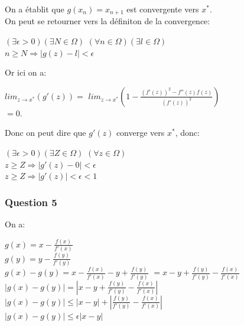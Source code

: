 \documentclass{article}
\begin{document}
	On a établit que $g(x_{n})=x_{n+1}$ est convergente vers $x^{*}$.\\
	
	On peut se retourner vers la définiton de la convergence:\\
	
	\begin{center}
	\begin{large}
		$(\exists \epsilon>0)(\exists N \in \Omega)$
		$(\forall n \in \Omega)(\exists l \in \Omega)$\\
		$n \geq N \Rightarrow |g(z)-l| < \epsilon$		\end{large}
	\end{center}
	
	Or ici on a:\\
	
	\begin{center}
		\begin{large}
			$lim_{z \to x^{*}}(g'(z))=$
			$lim_{z \to x^{*}}(1-\frac{(f'(z))^{2}-f''(z)f(z)}{(f'(z))^{2}})$\\
			$=0$.
		\end{large}
	\end{center}
	
	Donc on peut dire que $g'(z)$ converge vers $x^{*}$, donc: 
	
	\begin{center}
	\begin{large}
		$(\exists \epsilon>0)(\exists Z \in \Omega)$
		$(\forall z \in \Omega)$\\
		$z \geq Z \Rightarrow |g'(z)-0| < \epsilon
$\\
	$z \geq Z \Rightarrow |g'(z)| < \epsilon < 1
$
	\end{large}
	\end{center}
	
	\subsubsection{Question 5}
	
	On a:
	
	\begin{center}
		\begin{large}
			$g(x)=x-\frac{f(x)}{f'(x)}$\\
			$g(y)=y-\frac{f(y)}{f'(y)}$\\
			$g(x)-g(y)=x-\frac{f(x)}{f'(x)}-y+\frac{f(y)}{f'(y)}$
			$=x-y+\frac{f(y)}{f'(y)}-\frac{f(x)}{f'(x)}$\\
			$|g(x)-g(y)| = |x-y+\frac{f(y)}{f'(y)}-\frac{f(x)}{f'(x)}|$\\
			$|g(x)-g(y)| \le |x-y|+|\frac{f(y)}{f'(y)}-\frac{f(x)}{f'(x)}|$\\
			$|g(x)-g(y)| \le \epsilon|x-y|$
		\end{large}
	\end{center}		
	
\end{document}
